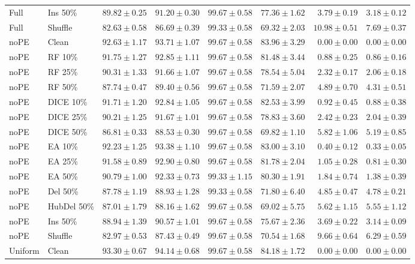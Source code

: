 {\begin{longtable}{llrrrrrr}
Full & Ins 50\% & $89.82\pm0.25$ & $91.20\pm0.30$ & $99.67\pm0.58$ & $77.36\pm1.62$ & $3.79\pm0.19$ & $3.18\pm0.12$ \\
Full & Shuffle & $82.63\pm0.58$ & $86.69\pm0.39$ & $99.33\pm0.58$ & $69.32\pm2.03$ & $10.98\pm0.51$ & $7.69\pm0.37$ \\
noPE & Clean & $92.63\pm1.17$ & $93.71\pm1.07$ & $99.67\pm0.58$ & $83.96\pm3.29$ & $0.00\pm0.00$ & $0.00\pm0.00$ \\
noPE & RF 10\% & $91.75\pm1.27$ & $92.85\pm1.11$ & $99.67\pm0.58$ & $81.48\pm3.44$ & $0.88\pm0.25$ & $0.86\pm0.16$ \\
noPE & RF 25\% & $90.31\pm1.33$ & $91.66\pm1.07$ & $99.67\pm0.58$ & $78.54\pm5.04$ & $2.32\pm0.17$ & $2.06\pm0.18$ \\
noPE & RF 50\% & $87.74\pm0.47$ & $89.40\pm0.56$ & $99.67\pm0.58$ & $71.59\pm2.07$ & $4.89\pm0.70$ & $4.31\pm0.51$ \\
noPE & DICE 10\% & $91.71\pm1.20$ & $92.84\pm1.05$ & $99.67\pm0.58$ & $82.53\pm3.99$ & $0.92\pm0.45$ & $0.88\pm0.38$ \\
noPE & DICE 25\% & $90.21\pm1.25$ & $91.67\pm1.01$ & $99.67\pm0.58$ & $78.83\pm3.60$ & $2.42\pm0.23$ & $2.04\pm0.39$ \\
noPE & DICE 50\% & $86.81\pm0.33$ & $88.53\pm0.30$ & $99.67\pm0.58$ & $69.82\pm1.10$ & $5.82\pm1.06$ & $5.19\pm0.85$ \\
noPE & EA 10\% & $92.23\pm1.25$ & $93.38\pm1.10$ & $99.67\pm0.58$ & $83.00\pm3.10$ & $0.40\pm0.12$ & $0.33\pm0.05$ \\
noPE & EA 25\% & $91.58\pm0.89$ & $92.90\pm0.80$ & $99.67\pm0.58$ & $81.78\pm2.04$ & $1.05\pm0.28$ & $0.81\pm0.30$ \\
noPE & EA 50\% & $90.79\pm1.00$ & $92.33\pm0.73$ & $99.33\pm1.15$ & $80.30\pm1.91$ & $1.84\pm0.74$ & $1.38\pm0.39$ \\
noPE & Del 50\% & $87.78\pm1.19$ & $88.93\pm1.28$ & $99.33\pm0.58$ & $71.80\pm6.40$ & $4.85\pm0.47$ & $4.78\pm0.21$ \\
noPE & HubDel 50\% & $87.01\pm1.79$ & $88.16\pm1.62$ & $99.67\pm0.58$ & $69.02\pm5.75$ & $5.62\pm1.15$ & $5.55\pm1.12$ \\
noPE & Ins 50\% & $88.94\pm1.39$ & $90.57\pm1.01$ & $99.67\pm0.58$ & $75.67\pm2.36$ & $3.69\pm0.22$ & $3.14\pm0.09$ \\
noPE & Shuffle & $82.97\pm0.53$ & $87.43\pm0.49$ & $99.67\pm0.58$ & $70.54\pm1.68$ & $9.66\pm0.64$ & $6.29\pm0.59$ \\
Uniform & Clean & $93.30\pm0.67$ & $94.14\pm0.68$ & $99.67\pm0.58$ & $84.18\pm1.72$ & $0.00\pm0.00$ & $0.00\pm0.00$ \\

\end{longtable}}
